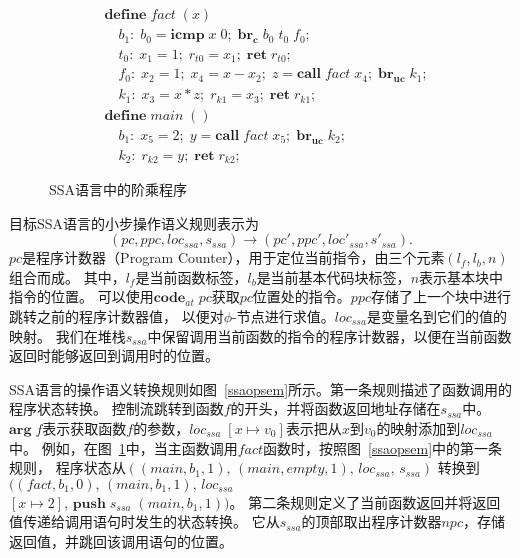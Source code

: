 \begin{figure}[ht]
    \centering
    \begin{equation}
        \nonumber
        \begin{aligned}
            & \mathbf{define}\; fact\; (x)\\
            & \quad b_1:\; b_0 = \mathbf{icmp}\; x\; 0;\; \mathbf{br_c}\; b_0\; t_0\; f_0; \\
            & \quad t_0:\; x_1 = 1;\; r_{t0} = x_1;\; \mathbf{ret}\; r_{t0}; \\
            & \quad f_0:\; x_2 = 1;\; x_4 = x - x_2;\; z = \mathbf{call}\; fact\; x_4;\; \mathbf{br_{uc}}\; k_1; \\
            & \quad k_1:\; x_3 = x*z;\; r_{k1} = x_3;\; \mathbf{ret}\; r_{k1}; \\
            & \mathbf{define}\; main\; ( )\\
            & \quad b_1:\; x_5 = 2;\; y = \mathbf{call}\; fact\; x_5;\; \mathbf{br_{uc}}\; k_2;\\
            & \quad k_2:\; r_{k2} = y;\; \mathbf{ret}\; r_{k2};
        \end{aligned}
    \end{equation}
    \caption{SSA语言中的阶乘程序}\label{factssa}
\end{figure}

目标SSA语言的小步操作语义规则表示为
\begin{equation}
(pc, ppc, loc_{ssa}, s_{ssa}) \rightarrow (pc', ppc', loc'_{ssa}, s'_{ssa}).
\end{equation}
$pc$是程序计数器（Program Counter），用于定位当前指令，由三个元素$(l_{f}, l_b, n)$组合而成。
其中，$l_{f}$是当前函数标签，$l_b$是当前基本代码块标签，$n$表示基本块中指令的位置。
可以使用$\mathbf{code}_{at}\; pc$获取$pc$位置处的指令。$ppc$存储了上一个块中进行跳转之前的程序计数器值，
以便对$\phi$-节点进行求值。$loc_{ssa}$是变量名到它们的值的映射。
我们在堆栈$s_{ssa}$中保留调用当前函数的指令的程序计数器，以便在当前函数返回时能够返回到调用时的位置。

SSA语言的操作语义转换规则如图~\ref{ssaopsem}所示。第一条规则描述了函数调用的程序状态转换。
控制流跳转到函数$f$的开头，并将函数返回地址存储在$s_{ssa}$中。
$\mathbf{arg}\; f$表示获取函数$f$的参数，$loc_{ssa}\; [x\mapsto v_0]$表示把从$x$到$v_0$的映射添加到$loc_{ssa}$中。
例如，在图~\ref{factssa}中，当主函数调用$fact$函数时，按照图~\ref{ssaopsem}中的第一条规则，
程序状态从$((main,b_1,1),\, (main,empty,1),\, loc_{ssa},\, s_{ssa})$ 
转换到$((fact,b_1,0),\, (main,b_1,1),\, loc_{ssa}$ \\ $[x\mapsto 2],\, \mathbf{push}\; s_{ssa}\; (main,b_1,1))$。
第二条规则定义了当前函数返回并将返回值传递给调用语句时发生的状态转换。
它从$s_{ssa}$的顶部取出程序计数器$npc$，存储返回值，并跳回该调用语句的位置。

